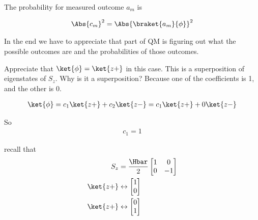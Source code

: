 The probability for measured outcome \(a_m\) is

\begin{equation}\label{eqn:PHY356Foct26:105}
\begin{aligned}
\Abs{c_m}^2 = \Abs{ \braket{a_m}{\phi} }^2
\end{aligned}
\end{equation}

In the end we have to appreciate that part of QM is figuring out what the possible outcomes are and the probabilities of those outcomes.

Appreciate that \(\ket{\phi} = \ket{z+}\) in this case.  This is a superposition of eigenstates of \(S_z\).  Why is it a superposition?  Because one of the coefficients is 1, and the other is 0.

\begin{equation}\label{eqn:PHY356Foct26:106}
\begin{aligned}
\ket{\phi}
=
 c_1 \ket{z+}
+ c_2 \ket{z-}
=
 c_1 \ket{z+}
+ 0 \ket{z-}
\end{aligned}
\end{equation}

So
\begin{equation}\label{eqn:PHY356Foct26:107}
\begin{aligned}
c_1 = 1
\end{aligned}
\end{equation}

recall that
\begin{equation}\label{eqn:PHY356Foct26:108}
\begin{aligned}
S_z &= \frac{\Hbar}{2}
\begin{bmatrix}
1 & 0 \\
0 & -1
\end{bmatrix} \\
\ket{z+} &\leftrightarrow
\begin{bmatrix}
1 \\
0
\end{bmatrix} \\
\ket{z+} &\leftrightarrow
\begin{bmatrix}
0 \\
1
\end{bmatrix}
\end{aligned}
\end{equation}

